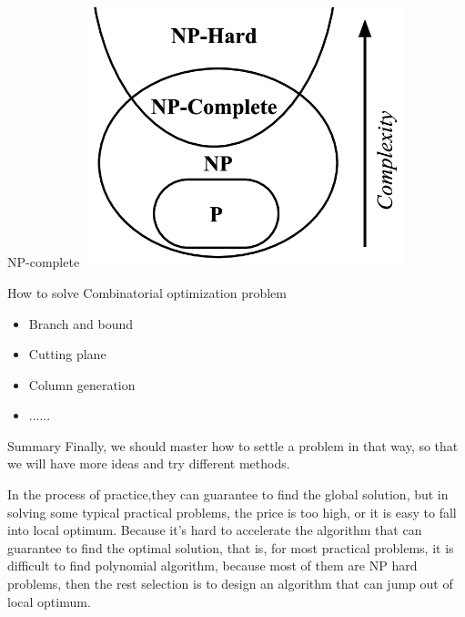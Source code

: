    \begin{frame}{NP-complete}
     \centering
     \includegraphics[width = 0.7\textwidth]{images/NP.png}
   \end{frame}

   \begin{frame}{How to solve Combinatorial optimization problem}
     \Large
     \begin{spacing}{1.5}
       \begin{itemize}
         \item Branch and bound
         \item Cutting plane
         \item Column generation
         \item ......
       \end{itemize}
     \end{spacing}
   \end{frame}


   \begin{frame}{Summary}
     Finally, we should master how to settle a problem in that way, so that we will have more ideas and try different methods.

     In the process of practice,they can guarantee to find the global solution, but in solving some typical practical problems, the price is too high, or it is easy to fall into local optimum. Because it's hard to accelerate the algorithm that can guarantee to find the optimal solution, that is, for most practical problems, it is difficult to find polynomial algorithm, because most of them are NP hard problems, then the rest selection is to design an algorithm that can jump out of local optimum.
   \end{frame}
